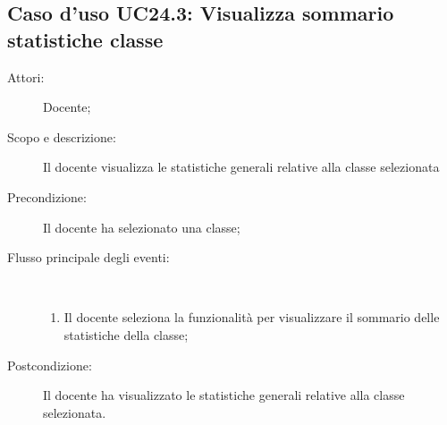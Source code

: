 \subsection{Caso d'uso UC24.3: Visualizza sommario statistiche classe}\begin{description}
	\item[Attori:] Docente;
	\item[Scopo e descrizione:] Il docente visualizza le statistiche generali relative alla classe selezionata
	\item[Precondizione:] Il docente ha selezionato una classe;
	
	\item[Flusso principale degli eventi:] \ 
	\begin{enumerate}
		\item Il docente seleziona la funzionalità per visualizzare il sommario delle statistiche della classe;
		
	\end{enumerate}
	\item[Postcondizione:] Il docente ha visualizzato le statistiche generali relative alla classe selezionata.
\end{description}
\hypertarget{UC24.4}{}
